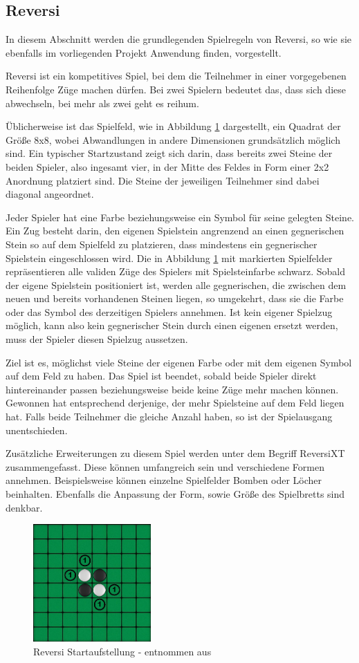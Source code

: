 \subsection{Reversi}

In diesem Abschnitt werden die grundlegenden Spielregeln \cite{WikipediaOthello} von Reversi, so wie sie ebenfalls im vorliegenden Projekt Anwendung finden, vorgestellt.

Reversi ist ein kompetitives Spiel, bei dem die Teilnehmer in einer vorgegebenen Reihenfolge Z\"{u}ge machen d\"{u}rfen. Bei zwei Spielern bedeutet das, dass sich diese abwechseln, bei mehr als zwei geht es reihum. 

\"{U}blicherweise ist das Spielfeld, wie in Abbildung \ref{fig:reversi_start} dargestellt, ein Quadrat der Gr\"{o}\ss e 8x8, wobei Abwandlungen in andere Dimensionen grunds\"{a}tzlich m\"{o}glich sind. Ein typischer Startzustand zeigt sich darin, dass bereits zwei Steine der beiden Spieler, also ingesamt vier, in der Mitte des Feldes in Form einer 2x2 Anordnung platziert sind. Die Steine der jeweiligen Teilnehmer sind dabei diagonal angeordnet.

Jeder Spieler hat eine Farbe beziehungsweise ein Symbol f\"{u}r seine gelegten Steine. Ein Zug besteht darin, den eigenen Spielstein angrenzend an einen gegnerischen Stein so auf dem Spielfeld zu platzieren, dass mindestens ein gegnerischer Spielstein eingeschlossen wird. Die in Abbildung \ref{fig:reversi_start} mit \grqq{} markierten Spielfelder repräsentieren alle validen Züge des Spielers mit Spielsteinfarbe schwarz. Sobald der eigene Spielstein positioniert ist, werden alle gegnerischen, die zwischen dem neuen und bereits vorhandenen Steinen liegen, so umgekehrt, dass sie die Farbe oder das Symbol des derzeitigen Spielers annehmen. Ist kein eigener Spielzug m\"{o}glich, kann also kein gegnerischer Stein durch einen eigenen ersetzt werden, muss der Spieler diesen Spielzug aussetzen. 

Ziel ist es, m\"{o}glichst viele Steine der eigenen Farbe oder mit dem eigenen Symbol auf dem Feld zu haben. Das Spiel ist beendet, sobald beide Spieler direkt hintereinander passen beziehungsweise beide keine Z\"{u}ge mehr machen k\"{o}nnen. Gewonnen hat entsprechend derjenige, der mehr Spielsteine auf dem Feld liegen hat. Falls beide Teilnehmer die gleiche Anzahl haben, so ist der Spielausgang unentschieden.

Zusätzliche Erweiterungen zu diesem Spiel werden unter dem Begriff \glqq{}ReversiXT\grqq{} zusammengefasst. Diese können umfangreich sein und verschiedene Formen annehmen. Beispielsweise können einzelne Spielfelder Bomben oder Löcher beinhalten. Ebenfalls die Anpassung der Form, sowie Größe des Spielbretts sind denkbar.

\begin{figure}
	\centering
	\includegraphics[width=0.4\textwidth]{pics/reversi_start.png}	
	\caption{Reversi Startaufstellung - entnommen aus \cite{PlayReversi}}
	\label{fig:reversi_start}
\end{figure}